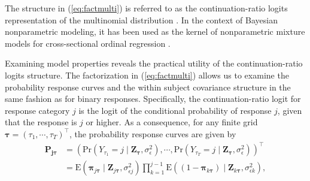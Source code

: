 The structure in (\ref{eq:factmulti}) is referred to as the continuation-ratio logits representation 
of the multinomial distribution \citep{Tutz1991}. In the context of Bayesian nonparametric modeling,
it has been used as the kernel of nonparametric mixture models for cross-sectional ordinal 
regression \citep{KangKottas2022}. 


Examining model properties reveals the practical utility of the continuation-ratio logits 
structure. The factorization in (\ref{eq:factmulti}) allows us to examine the probability response 
curves and the within subject covariance structure in the same fashion as for binary responses. 
Specifically, the continuation-ratio logit for response category $j$ is the logit of the conditional 
probability of response $j$, given that the response is $j$ or higher. As a consequence, for any 
finite grid $\boldsymbol{\tau}=(\tau_1,\cdots,\tau_T)^{\top}$, the probability response 
curves are given by
\begin{equation}
\begin{split}
\mathbf{P}_{\mathbf{j}\boldsymbol{\tau}}& = (\text{Pr}(Y_{\tau_1}=j\mid \mathbf{Z}_{\boldsymbol{\tau}},\sigma_{\epsilon}^2),
\cdots,\text{Pr}(Y_{\tau_T}=j\mid \mathbf{Z}_{\boldsymbol{\tau}},
\sigma_{\epsilon}^2))^{\top}\\
&=\text{E}\left( \boldsymbol{\pi}_{j \boldsymbol{\tau}}\mid \mathbf{Z}_{j 
\boldsymbol{\tau}},\sigma_{\epsilon j}^2 \right)
\prod_{k=1}^{j-1} \text{E}\left( (1-\boldsymbol{\pi}_{k \boldsymbol{\tau}})\mid \mathbf{Z}_{k \boldsymbol{\tau}},\sigma_{\epsilon k}^2 \right),
\end{split}
	\label{eq:probmult}
\end{equation}

